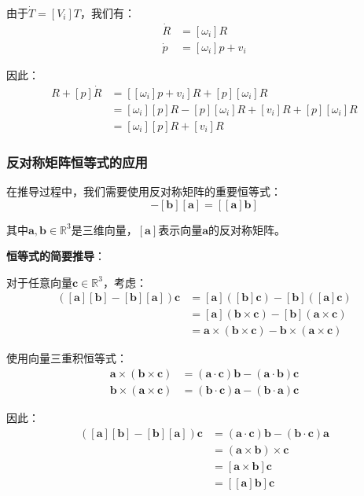 \documentclass[12pt,a4paper]{article}
\begin{document}
由于$\dot{T} = [V_i] T$，我们有：
\begin{align}
\dot{R} &= [\omega_i] R \\
\dot{p} &= [\omega_i] p + v_i
\end{align}

因此：
\begin{align}
[\dot{p}]R + [p]\dot{R} &= [[\omega_i] p + v_i] R + [p][\omega_i] R \\
                        &= [\omega_i][p] R - [p][\omega_i] R + [v_i] R + [p][\omega_i] R \\
                        &= [\omega_i][p] R + [v_i] R
\end{align}

\subsubsection{反对称矩阵恒等式的应用}

在推导过程中，我们需要使用反对称矩阵的重要恒等式：
\begin{equation}
[\bm{a}][\bm{b}] - [\bm{b}][\bm{a}] = [[\bm{a}]\bm{b}]
\label{eq:skew_identity}
\end{equation}

其中$\bm{a}, \bm{b} \in \mathbb{R}^3$是三维向量，$[\bm{a}]$表示向量$\bm{a}$的反对称矩阵。

\textbf{恒等式的简要推导}：

对于任意向量$\bm{c} \in \mathbb{R}^3$，考虑：
\begin{align}
([\bm{a}][\bm{b}] - [\bm{b}][\bm{a}])\bm{c} &= [\bm{a}]([\bm{b}]\bm{c}) - [\bm{b}]([\bm{a}]\bm{c}) \\
&= [\bm{a}](\bm{b} \times \bm{c}) - [\bm{b}](\bm{a} \times \bm{c}) \\
&= \bm{a} \times (\bm{b} \times \bm{c}) - \bm{b} \times (\bm{a} \times \bm{c})
\end{align}

使用向量三重积恒等式：
\begin{align}
\bm{a} \times (\bm{b} \times \bm{c}) &= (\bm{a} \cdot \bm{c})\bm{b} - (\bm{a} \cdot \bm{b})\bm{c} \\
\bm{b} \times (\bm{a} \times \bm{c}) &= (\bm{b} \cdot \bm{c})\bm{a} - (\bm{b} \cdot \bm{a})\bm{c}
\end{align}

因此：
\begin{align}
([\bm{a}][\bm{b}] - [\bm{b}][\bm{a}])\bm{c} &= (\bm{a} \cdot \bm{c})\bm{b} - (\bm{b} \cdot \bm{c})\bm{a} \\
&= (\bm{a} \times \bm{b}) \times \bm{c} \\
&= [\bm{a} \times \bm{b}]\bm{c} \\
&= [[\bm{a}]\bm{b}]\bm{c}
\end{align}
\end{document}
